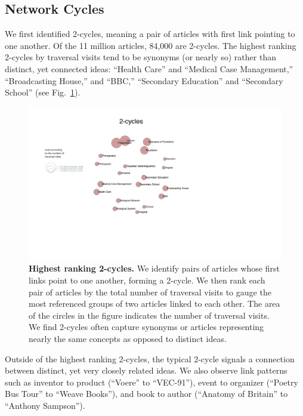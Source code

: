 \documentclass[pre,twocolumn,twoside,superscriptaddress,floatfix, aps, 10pt]{revtex4-1}
\begin{document}
\subsection{Network Cycles}

We first identified 2-cycles, meaning a pair of articles with first link pointing to one another.
Of the 11 million articles, 84,000 are 2-cycles. 
The highest ranking 2-cycles by traversal visits tend to be synonyms (or nearly so) rather than distinct, yet connected ideas:
``Health Care'' and ``Medical Case Management,'' ``Broadcasting House,'' and ``BBC,'' ``Secondary Education'' and ``Secondary School'' 
(see Fig.~\ref{fig:2-cycles}).

\begin{figure}[tp!]
  \centering	
  \includegraphics[width=\textwidth]{graphics/2_cycles.pdf}
  \caption{
    \textbf{Highest ranking 2-cycles.}
    We identify pairs of articles whose first links point to one another, forming
    a 2-cycle. We then rank each pair of articles by the total number of 
    traversal visits to gauge the most referenced groups of two articles linked
    to each other. The area of the circles in the figure indicates the number of traversal visits. We find 2-cycles often capture synonyms or articles representing nearly the 
    same concepts as opposed to distinct ideas.
  }
  \label{fig:2-cycles}
\end{figure}

Outside of the highest ranking 2-cycles, the typical 2-cycle signals a connection between distinct, yet very closely related ideas. 
We also observe link patterns such as inventor to product (``Voere'' to ``VEC-91''), event to organizer (``Poetry Bus Tour'' to ``Weave Books''), and book to author (``Anatomy of Britain'' to ``Anthony Sampson'').
\end{document}
